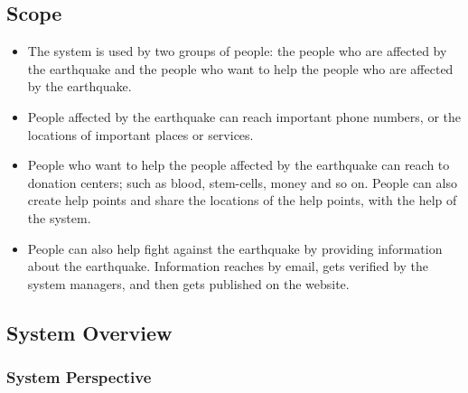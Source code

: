 \documentclass[a4paper]{article}
\begin{document}
            \subsection{Scope}
            \begin{itemize}
                \item The system is used by two groups of people: the people who are affected by the earthquake and the people who want to help the people who are affected by the earthquake.
                \item People affected by the earthquake can reach important phone numbers, or the locations of important places or services.
                \item People who want to help the people affected by the earthquake can reach to donation centers; such as blood, stem-cells, money and so on. People can also create help points and share the locations of the help points, with the help of the system.
                \item People can also help fight against the earthquake by providing information about the earthquake. Information reaches by email, gets verified by the system managers, and then gets published on the website.
            \end{itemize}

            \subsection{System Overview}

                \subsubsection{System Perspective}

                \begin{center}
                        \fbox{}
                \end{center}
\end{document}
